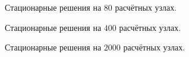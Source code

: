 \documentclass[14pt, a4paper, fleqn]{extarticle}
\begin{document}
\begin{figure}[H]
\caption{Стационарные решения на $80$ расчётных узлах.}
\end{figure}

\begin{figure}[H]
\caption{Стационарные решения на $400$ расчётных узлах.}
\end{figure}

\begin{figure}[H]
\caption{Стационарные решения на $2000$ расчётных узлах.}
\end{figure}
\end{document}
